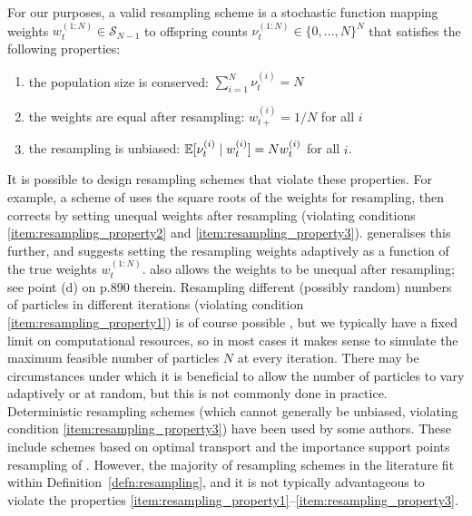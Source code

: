 \begin{defn}\label{defn:resampling}
For our purposes, a valid resampling scheme is a stochastic function mapping weights 
$w_t^{(1:N)} \in \mathcal{S}_{N-1}$ 
to offspring counts 
$\nu_t^{(1:N)} \in \{0,\dots,N\}^N $
that satisfies the following properties:
\begin{enumerate}
\item\label{item:resampling_property1} the population size is conserved:
$ \sum_{i=1}^N \nu_t^{(i)} =N $
\item\label{item:resampling_property2} the weights are equal after resampling:
$w_{t+}^{(i)} = 1/N$ for all $i$
\item\label{item:resampling_property3} the resampling is unbiased:
$ \mathbb{E}[ \nu_t^{(i)} \mid w_t^{(i)} ] = N w_t^{(i)} $ for all $i$.
\end{enumerate}
\end{defn}
It is possible to design resampling schemes that violate these properties.
For example, a scheme of \textcite{liu1998} uses the square roots of the weights for resampling, then corrects by setting unequal weights after resampling (violating conditions \ref{item:resampling_property2} and \ref{item:resampling_property3}).
\textcite[Section 3.1]{liu2001} generalises this further, and suggests setting the resampling weights adaptively as a function of the true weights $w_t^{(1:N)}$.
\textcite{fearnhead2003} also allows the weights to be unequal after resampling; see point (d) on p.890 therein.
%
Resampling different (possibly random) numbers of particles in different iterations (violating condition \ref{item:resampling_property1}) is of course possible \parencite[see for example][]{crisan1998}, but we typically have a fixed limit on computational resources, so in most cases it makes sense to simulate the maximum feasible number of particles $N$ at every iteration.
There may be circumstances under which it is beneficial to allow the number of particles to vary adaptively or at random, but this is not commonly done in practice.
%
Deterministic resampling schemes (which cannot generally be unbiased, violating condition \ref{item:resampling_property3}) have been used by some authors. These include schemes based on optimal transport \parencite{reich2013, myers2021, corenflos2021} and the importance support points resampling of \textcite{huang2020}.
However, the majority of resampling schemes in the literature fit within Definition~\ref{defn:resampling}, and it is not typically advantageous to violate the properties \ref{item:resampling_property1}--\ref{item:resampling_property3}.

